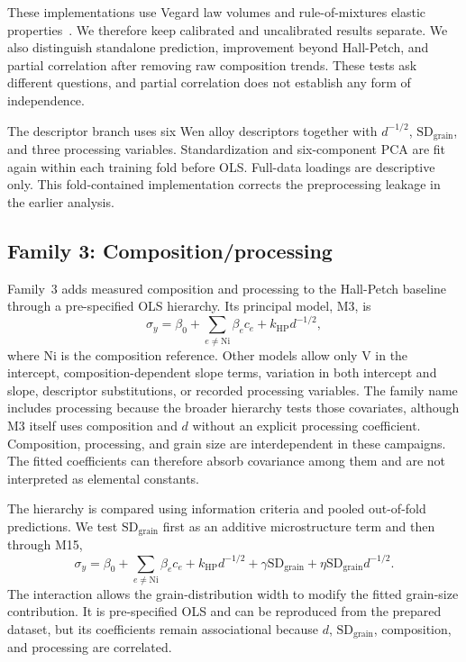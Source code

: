 \documentclass[5p,times,twocolumn]{elsarticle}
\newcommand{\familythree}{Composition/processing}
\begin{document}
These implementations use Vegard law volumes and rule-of-mixtures elastic properties~\cite{Varvenne2016,Varvenne2017,Labusch1970,TodaCaraballo2015}. We therefore keep calibrated and uncalibrated results separate. We also distinguish standalone prediction, improvement beyond Hall-Petch, and partial correlation after removing raw composition trends. These tests ask different questions, and partial correlation does not establish any form of independence.

The descriptor branch uses six Wen alloy descriptors together with $d^{-1/2}$, $\mathrm{SD}_{\mathrm{grain}}$, and three processing variables. Standardization and six-component PCA are fit again within each training fold before OLS. Full-data loadings are descriptive only. This fold-contained implementation corrects the preprocessing leakage in the earlier analysis.

\subsection{Family 3: \familythree}

Family~3 adds measured composition and processing to the Hall-Petch baseline through a pre-specified OLS hierarchy. Its principal model, M3, is
\begin{equation}
\sigma_y=\beta_0+\sum_{e\ne\mathrm{Ni}}\beta_e c_e
              +k_{\mathrm{HP}}d^{-1/2},
\label{eq:m3}
\end{equation}
where Ni is the composition reference. Other models allow only V in the intercept, composition-dependent slope terms, variation in both intercept and slope, descriptor substitutions, or recorded processing variables. The family name includes processing because the broader hierarchy tests those covariates, although M3 itself uses composition and $d$ without an explicit processing coefficient. Composition, processing, and grain size are interdependent in these campaigns. The fitted coefficients can therefore absorb covariance among them and are not interpreted as elemental constants.

The hierarchy is compared using information criteria and pooled out-of-fold predictions. We test $\mathrm{SD}_{\mathrm{grain}}$ first as an additive microstructure term and then through M15,
\begin{equation}
\sigma_y=\beta_0+\sum_{e\ne\mathrm{Ni}}\beta_e c_e
 +k_{\mathrm{HP}}d^{-1/2}+\gamma\mathrm{SD}_{\mathrm{grain}}
 +\eta\mathrm{SD}_{\mathrm{grain}}d^{-1/2}.
\label{eq:m15}
\end{equation}
The interaction allows the grain-distribution width to modify the fitted grain-size contribution. It is pre-specified OLS and can be reproduced from the prepared dataset, but its coefficients remain associational because $d$, $\mathrm{SD}_{\mathrm{grain}}$, composition, and processing are correlated.
\end{document}
